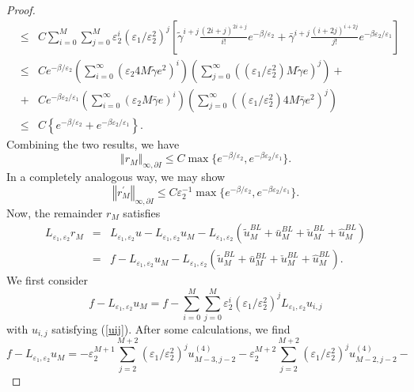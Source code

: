 \documentclass[12pt]{article}
\begin{document}
\begin{proof}
\begin{eqnarray*}
&\leq& C \sum_{i=0}^{M} \sum_{j=0}^{M} \varepsilon _{2}^{i} \left( \varepsilon _{1} / \varepsilon _{2}^{2} \right)^{j} \left[ \tilde{\gamma}^{i+j} \frac{(2i+j)^{2i+j}}{i!} e^{-\beta / \varepsilon _{2}} + \bar{\gamma}^{i+j} \frac{(i+2j)^{i+2j}}{j!} e^{-\beta \varepsilon _{2} / \varepsilon _{1}} \right] \\
&\leq& C e^{-\beta / \varepsilon _{2}} \left( \sum_{i=0}^{\infty} (\varepsilon_2 4M \tilde{\gamma} e^2)^i \right) \left( \sum_{j=0}^{\infty} ((\varepsilon_1 / \varepsilon_2^2) M \tilde{\gamma} e)^j \right) + \\
&+& C e^{-\beta \varepsilon _{2} / \varepsilon _{1}} \left( \sum_{i=0}^{\infty} (\varepsilon_2 M \bar{\gamma} e)^i \right) \left( \sum_{j=0}^{\infty} ((\varepsilon_1 / \varepsilon_2^2) 4M \bar{\gamma} e^2)^j \right) \\
&\leq& C \left\{ e^{-\beta / \varepsilon _{2}} + e^{-\beta \varepsilon _{2} / \varepsilon _{1}} \right\}.
\end{eqnarray*}
%
Combining the two results, we have
%
\begin{equation*}
\left\Vert r_M \right\Vert _{\infty ,\partial I} \leq C \max \{ e^{-\beta / \varepsilon _{2}},e^{-\beta \varepsilon _{2} / \varepsilon _{1}} \}.
\end{equation*}
%
In a completely analogous way, we may show
%
\begin{equation*}
\left\Vert r_M^{\prime } \right\Vert _{\infty ,\partial I} \leq C \varepsilon _2^{-1} \max \{ e^{-\beta / \varepsilon _{2}},e^{-\beta \varepsilon _{2} / \varepsilon _{1}} \}.
\end{equation*}
%
Now, the remainder $r_M$ satisfies
%
\begin{eqnarray*}
L_{\varepsilon_1, \varepsilon_2} r_M &=& L_{\varepsilon_1, \varepsilon_2} u - L_{\varepsilon_1, \varepsilon_2} u_M 
- L_{\varepsilon_1, \varepsilon_2} \left( \tilde{u}_M^{BL} + \bar{u}_M^{BL} + \check{u}_M^{BL} + \hat{u}_{M}^{BL} \right)  \\
&=& f - L_{\varepsilon_1, \varepsilon_2} u_M -L_{\varepsilon_1, \varepsilon_2} \left( \tilde{u}_M^{BL} + \bar{u}_M^{BL} + \check{u}_M^{BL} + \hat{u}_{M}^{BL} \right).
\end{eqnarray*}
We first consider
\[
f - L_{\varepsilon_1, \varepsilon_2} u_M = f - \sum_{i=0}^M \sum_{j=0}^M \varepsilon_2^i (\varepsilon_1 / \varepsilon_2^2)^j
L_{\varepsilon_1, \varepsilon_2} u_{i,j}
\]
with $u_{i,j}$ satisfying (\ref{uij}). After some calculations, we find
\[
f - L_{\varepsilon_1, \varepsilon_2} u_M = - \varepsilon_2^{M+1} \sum_{j=2}^{M+2} (\varepsilon_1 / \varepsilon_2^2)^j u_{M-3,j-2}^{(4)} - \varepsilon_2^{M+2} \sum_{j=2}^{M+2} (\varepsilon_1 / \varepsilon_2^2)^j u_{M-2,j-2}^{(4)} -
\]
\end{proof}
\end{document}
